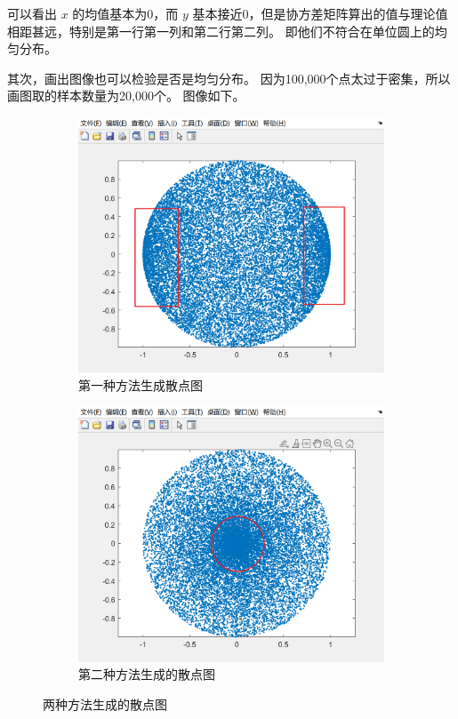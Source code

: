 \documentclass[12pt]{ctexart}
\begin{document}
可以看出 $x$ 的均值基本为0，而 $y$ 基本接近0，但是协方差矩阵算出的值与理论值相距甚远，特别是第一行第一列和第二行第二列。
即他们不符合在单位圆上的均匀分布。

其次，画出图像也可以检验是否是均匀分布。
因为100,000个点太过于密集，所以画图取的样本数量为20,000个。
图像如下。
\begin{figure}[h!]

    \begin{subfigure}[h!]{0.45\textwidth}
        \includegraphics[width=0.9\linewidth]{./figure/task1_3a.png}
        \caption{第一种方法生成散点图}
    \end{subfigure}
    \begin{subfigure}[h!]{0.45\textwidth}
        \includegraphics[width=0.9\linewidth]{./figure/task1_3b.png}
        \caption{第二种方法生成的散点图}
    \end{subfigure}

    \caption{两种方法生成的散点图}
\end{figure}
\end{document}
